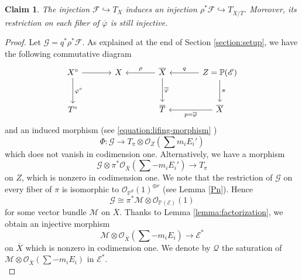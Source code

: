 \documentclass[english,reqno]{amsart}
\newcommand\bbP{{\mathbb P}}
\newcommand\sE{{\mathscr E}}
\newcommand\sF{{\mathscr F}}
\newcommand\sG{{\mathscr G}}
\newcommand\sM{{\mathscr M}}
\newcommand\sO{{\mathscr O}}
\newcommand\sQ{{\mathscr Q}}
\theoremstyle{plain}
\newtheorem{claim}[thm]{Claim}
\theoremstyle{definition}
\numberwithin{equation}{section} %
\begin{document}
\begin{claim}\label{claim:pullback-sheaf-in-tangent}
	The injection $\sF \hookrightarrow T_X$ induces an injection  $\rho^*\sF \hookrightarrow T_{\overline{X}/\overline{T}}$.
	Moreover, its restriction on each fiber of $\overline{\varphi}$ is still injective.
\end{claim}




\begin{proof}
	Let $\sG=q^*\rho^*\sF$. As explained at the end of Section \ref{section:setup}, we have the following commutative diagram
	\[\begin{tikzcd}[column sep=large, row sep=large]
	X^\circ \dar{\varphi^\circ}\rar &
	X & \overline{X} \lar[swap]{\rho}\dar{\overline{\varphi}} &
	Z=\bbP(\sE)\lar[swap]{q}\dar{\pi} \\
	T^\circ & &
	\overline{T} &
	\overline{X}\lar{p=\overline{\varphi}}
	\end{tikzcd}\] 
	and an induced morphism (see \eqref{equation:lifing-morphism} )
	$$
	\Phi\colon \sG \to T_{\pi}\otimes \sO_{Z}(\sum m_iE_i')
	$$
	which does not vanish in codimension one. Alternatively, we have a morphism 
	$$
	\sG \otimes \pi^*\sO_{\overline{X}}(\sum -m_iE_i') \to T_{\pi}
	$$ 
	on $Z$, which is nonzero in codimension one.
	We note that the restriction of $\sG$ on every fiber of $\pi$ is  isomorphic to $\sO_{\mathbb{P}^d}(1)^{\oplus r}$ (see Lemma \ref{Pn}).
	Hence $$\sG  \cong  \pi^*\sM \otimes \sO_{\mathbb{P}(\sE)}(1)$$  for some vector bundle $\sM$ on $ \overline{X}$.
	Thanks to Lemma \ref{lemma:factorization}, we obtain an injective morphism $$\sM\otimes \sO_{\overline{X}}(\sum -m_iE_i) \to \sE^*$$ on $\overline{X}$
	which is nonzero in codimension one.  We denote by $\sQ$  the  saturation of $\sM\otimes \sO_{\overline{X}}(\sum -m_i E_i)$     in $\sE^*$. \\
	
	
	

\end{proof}
\end{document}

